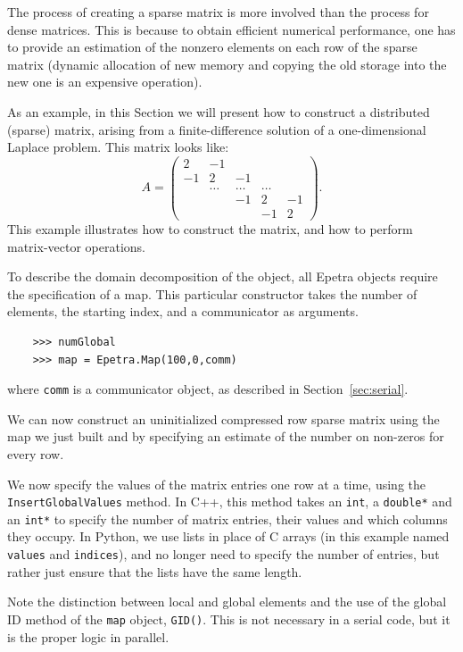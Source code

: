 \documentclass[10pt,relax]{SANDreport}
\begin{document}
The process of creating a sparse matrix is more involved than the
process for dense matrices. This is because to obtain efficient
numerical performance, one has to provide an estimation of the nonzero
elements on each row of the sparse matrix (dynamic allocation of new
memory and copying the old storage into the new one is an expensive
operation).

As an example, in this Section we will present how to construct a
distributed (sparse) matrix, arising from a finite-difference solution
of a one-dimensional Laplace problem. This matrix looks like:
\begin{equation*}
  A = \begin{pmatrix}
     2 & -1     &        &        &    \\
    -1 &  2     & -1     &        &    \\
       & \ldots & \ldots & \ldots &    \\
       &        & -1     & 2      & -1 \\
       &        &        & -1     & 2
\end{pmatrix}.
\end{equation*}
This example illustrates how to construct the matrix, and how to
perform matrix-vector operations.

To describe the domain decomposition of the object, all Epetra objects
require the specification of a map.  This particular constructor takes
the number of elements, the starting index, and a communicator as
arguments.
\begin{verbatim}
    >>> numGlobal
    >>> map = Epetra.Map(100,0,comm)
\end{verbatim}
where \verb!comm! is a communicator object, as described in
Section~\ref{sec:serial}.

We can now construct an uninitialized compressed row sparse matrix
using the map we just built and by specifying an estimate of the
number on non-zeros for every row.

We now specify the values of the matrix entries one row at a time,
using the {\tt InsertGlobalValues} method.  In C++, this method takes
an {\tt int}, a {\tt double*} and an {\tt int*} to specify the number
of matrix entries, their values and which columns they occupy.  In
Python, we use lists in place of C arrays (in this example named {\tt
  values} and {\tt indices}), and no longer need to specify the number
of entries, but rather just ensure that the lists have the same
length.

Note the distinction between local and global elements and the use of
the global ID method of the {\tt map} object, {\tt GID()}.  This is
not necessary in a serial code, but it is the proper logic in
parallel.  
\end{document}
